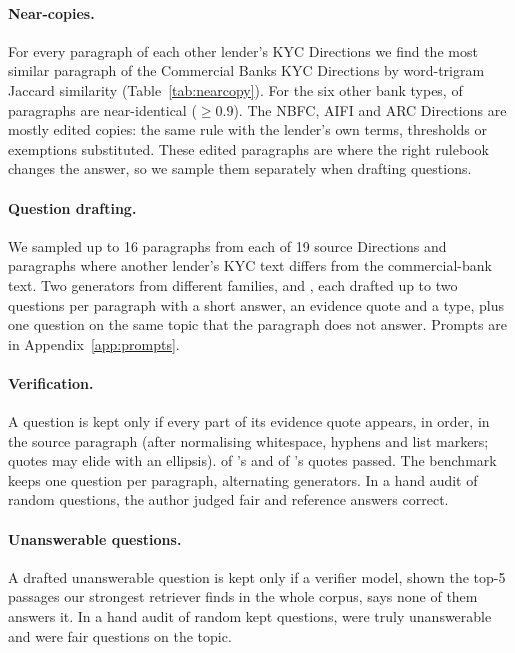 \documentclass[11pt]{article}
\begin{document}


\paragraph{Near-copies.} For every paragraph of each other lender's KYC Directions we find the most similar paragraph of the Commercial Banks KYC Directions by word-trigram Jaccard similarity (Table~\ref{tab:nearcopy}). For the six other bank types, \NearCopyBankRange{} of paragraphs are near-identical ($\geq0.9$). The NBFC, AIFI and ARC Directions are mostly edited copies: the same rule with the lender's own terms, thresholds or exemptions substituted. These edited paragraphs are where the right rulebook changes the answer, so we sample them separately when drafting questions.

\paragraph{Question drafting.} We sampled up to 16 paragraphs from each of 19 source Directions and \NEntityParas{} paragraphs where another lender's KYC text differs from the commercial-bank text. Two generators from different families, \GenA{} and \GenB{}, each drafted up to two questions per paragraph with a short answer, an evidence quote and a type, plus one question on the same topic that the paragraph does not answer. Prompts are in Appendix~\ref{app:prompts}.

\paragraph{Verification.} A question is kept only if every part of its evidence quote appears, in order, in the source paragraph (after normalising whitespace, hyphens and list markers; quotes may elide with an ellipsis). \QuoteOkGenA{} of \GenA{}'s and \QuoteOkGenB{} of \GenB{}'s quotes passed. The benchmark keeps one question per paragraph, alternating generators. In a hand audit of \AuditN{} random questions, the author judged \AuditFair{} fair and \AuditCorrect{} reference answers correct.

\paragraph{Unanswerable questions.} A drafted unanswerable question is kept only if a verifier model, shown the top-5 passages our strongest retriever finds in the whole corpus, says none of them answers it. In a hand audit of \AuditUnN{} random kept questions, \AuditUnTrue{} were truly unanswerable and \AuditUnFair{} were fair questions on the topic.
\end{document}
